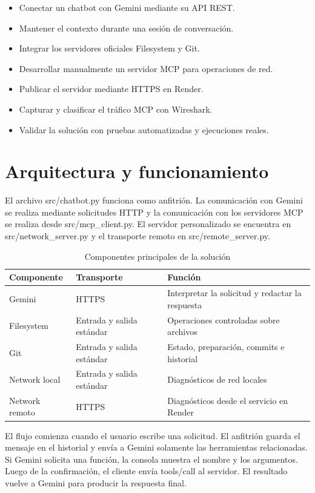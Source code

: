 \documentclass[12pt]{article}
\begin{document}
\begin{itemize}
    \item Conectar un chatbot con Gemini mediante su API REST.
    \item Mantener el contexto durante una sesión de conversación.
    \item Integrar los servidores oficiales Filesystem y Git.
    \item Desarrollar manualmente un servidor MCP para operaciones de red.
    \item Publicar el servidor mediante HTTPS en Render.
    \item Capturar y clasificar el tráfico MCP con Wireshark.
    \item Validar la solución con pruebas automatizadas y ejecuciones reales.
\end{itemize}

\section{Arquitectura y funcionamiento}

El archivo src/chatbot.py funciona como anfitrión. La comunicación con Gemini se realiza mediante solicitudes HTTP y la comunicación con los servidores MCP se realiza desde src/mcp\_client.py. El servidor personalizado se encuentra en src/network\_server.py y el transporte remoto en src/remote\_server.py.

\begin{table}[H]
\centering
\small
\begin{tabularx}{\textwidth}{|p{3.2cm}|p{2.8cm}|X|}
\hline
Componente & Transporte & Función \\
\hline
Gemini & HTTPS & Interpretar la solicitud y redactar la respuesta \\
\hline
Filesystem & Entrada y salida estándar & Operaciones controladas sobre archivos \\
\hline
Git & Entrada y salida estándar & Estado, preparación, commits e historial \\
\hline
Network local & Entrada y salida estándar & Diagnósticos de red locales \\
\hline
Network remoto & HTTPS & Diagnósticos desde el servicio en Render \\
\hline
\end{tabularx}
\caption{Componentes principales de la solución}
\end{table}

El flujo comienza cuando el usuario escribe una solicitud. El anfitrión guarda el mensaje en el historial y envía a Gemini solamente las herramientas relacionadas. Si Gemini solicita una función, la consola muestra el nombre y los argumentos. Luego de la confirmación, el cliente envía tools/call al servidor. El resultado vuelve a Gemini para producir la respuesta final.
\end{document}
